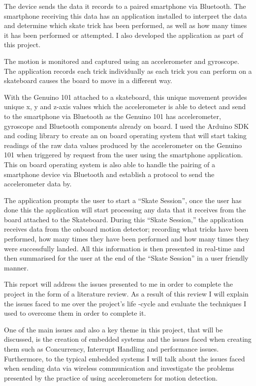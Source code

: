 The device sends the data it records to a paired smartphone via Bluetooth. The smartphone receiving this data has an application installed to interpret the data and determine which skate trick has been performed, as well as how many times it has been performed or attempted. I also developed the application as part of this project.

The motion is monitored and captured using an accelerometer and gyroscope. The application records each trick individually as each trick you can perform on a skateboard causes the board to move in a different way. 

With the Genuino 101 attached to a skateboard, this unique movement provides unique x, y and z-axis values which the accelerometer is able to detect and send to the smartphone via Bluetooth as the Genuino 101 has accelerometer, gyroscope and Bluetooth components already on board. I used the Arduino SDK and coding library to create an on board operating system that will start taking readings of the raw data values produced by the accelerometer on the Genuino 101 when triggered by request from the user using the smartphone application. This on board operating system is also able to handle the pairing of a smartphone device via Bluetooth and establish a protocol to send the accelerometer data by.

The application prompts the user to start a “Skate Session”, once the user has done this the application will start processing any data that it receives from the board attached to the Skateboard. During this “Skate Session,” the application receives data from the onboard motion detector; recording what tricks have been performed, how many times they have been performed and how many times they were successfully landed. All this information is then presented in real-time and then summarised for the user at the end of the “Skate Session” in a user friendly manner.

This report will address the issues presented to me in order to complete the project in the form of a literature review. As a result of this review I will explain the issues faced to me over the project’s life -cycle and evaluate the techniques I used to overcome them in order to complete it.

One of the main issues and also a key theme in this project, that will be discussed, is the creation of embedded systems and the issues faced when creating them such as Concurrency, Interrupt Handling and performance issues. Furthermore, to the typical embedded systems I will talk about the issues faced when sending data via wireless communication and investigate the problems presented by the practice of using accelerometers for motion detection.


